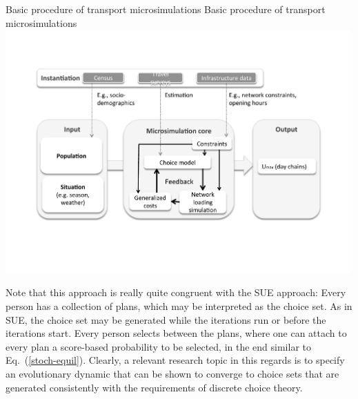 \createfigure%
{Basic procedure of transport microsimulations}%
{Basic procedure of transport microsimulations}%
{\label{fig:maxUtf}}%
{\includegraphics[width=0.99\textwidth, angle=0]{understanding/figures/maxUtf.pdf}}%
{}

Note that this approach is really quite congruent with the SUE
approach: Every person has a collection of plans, which may be
interpreted as the choice set.  As in SUE, the choice set may be
generated while the iterations run or before the iterations start.
Every person selects between the plans, where one can attach to
every plan a score-based probability to be selected, 
in the end similar to Eq.~(\ref{stoch-equil}).
Clearly, a relevant research topic in this regards is to specify 
an evolutionary dynamic that can be shown to converge to choice sets
that are generated consistently with the requirements of discrete
choice theory.




